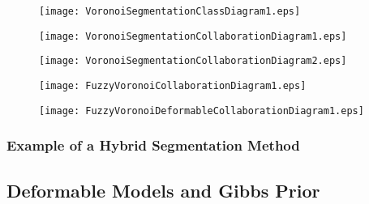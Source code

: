 \begin{figure}
\center
\texttt{[image: VoronoiSegmentationClassDiagram1.eps]}
\label{fig:UMLVoronoiSegmentationClassFilter}
\end{figure}

\begin{figure}
\center
\texttt{[image: VoronoiSegmentationCollaborationDiagram1.eps]}
\label{fig:UMLClassesforImplementationofVoronoiDiagramFilter}
\end{figure}


\begin{figure}
\center
\texttt{[image: VoronoiSegmentationCollaborationDiagram2.eps]}
\label{fig:UMLCollaborationDiagramoftheVoronoiSegmentationFilter}
\end{figure}


\begin{figure}
\center
\texttt{[image: FuzzyVoronoiCollaborationDiagram1.eps]}
\label{fig:UMLHybridMethodDiagram1}
\end{figure}

\begin{figure}
\center
\texttt{[image: FuzzyVoronoiDeformableCollaborationDiagram1.eps]}
\label{fig:UMLHybridMethodDiagram2}
\end{figure}



\subsubsection{Example of a Hybrid Segmentation Method}
\label{sec:HybridMethod1:Example}

\ifitkFullVersion

\fi



\subsection{Deformable Models and Gibbs Prior}

